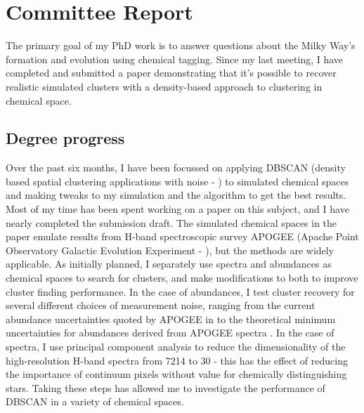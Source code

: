 \documentclass[11pt]{article}
\begin{document}
    
    \section*{Committee Report}
    
    The primary goal of my PhD work is to answer questions about the Milky Way's formation and evolution using chemical tagging. Since my last meeting, I have completed and submitted a paper demonstrating that it's possible to recover realistic simulated clusters with a density-based approach to clustering in chemical space.    

    \subsection*{Degree progress}

	Over the past six months, I have been focussed on applying DBSCAN (density based spatial clustering applications with noise - \citealt{Ester1996}) to simulated chemical spaces and making tweaks to my simulation and the algorithm to get the best results. Most of my time has been spent working on a paper on this subject, and I have nearly completed the submission draft. The simulated chemical spaces in the paper emulate results from H-band spectroscopic survey APOGEE (Apache Point Observatory Galactic Evolution Experiment - \citealt{Majewski2017}), but the methods are widely applicable. As initially planned, I separately use spectra and abundances as chemical spaces to search for clusters, and make modifications to both to improve cluster finding performance. In the case of abundances, I test cluster recovery for several different choices of measurement noise, ranging from the current abundance uncertainties quoted by APOGEE in \citet{Abolfathi2018} to the theoretical minimum uncertainties for abundances derived from APOGEE spectra \citep{Ting2016b}. In the case of spectra, I use principal component analysis to reduce the dimensionality of the high-resolution H-band spectra from 7214 to 30 - this has the effect of reducing the importance of continuum pixels without value for chemically distinguishing stars. Taking these steps has allowed me to investigate the performance of DBSCAN in a variety of chemical spaces.
	
\end{document}
